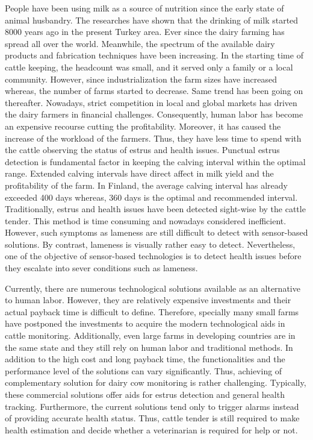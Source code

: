 \documentclass[english,12pt,a4paper,pdftex,elec,utf8]{aaltothesis}
\begin{document}
People have been using milk as a source of nutrition since the early state of animal husbandry. The researches have shown that the drinking of milk started 8000 years ago in the present Turkey area. Ever since the dairy farming has spread all over the world. Meanwhile, the spectrum of the available dairy products and fabrication techniques have been increasing. In the starting time of cattle keeping, the headcount was small, and it served only a family or a local community. However, since industrialization the farm sizes have increased whereas, the number of farms started to decrease. Same trend has been going on thereafter. Nowadays, strict competition in local and global markets has driven the dairy farmers in financial challenges. Consequently, human labor has become an expensive recourse cutting the profitability. Moreover, it has caused the increase of the workload of the farmers. Thus, they have less time to spend with the cattle observing the status of estrus and health issues. Punctual estrus detection is fundamental factor in keeping the calving interval within the optimal range. Extended calving intervals have direct affect in milk yield and the profitability of the farm. In Finland, the average calving interval has already exceeded 400 days whereas, 360 days is the optimal and recommended interval. Traditionally, estrus and health issues have been detected sight-wise by the cattle tender. This method is time consuming and nowadays considered inefficient. However, such symptoms as lameness are still difficult to detect with sensor-based solutions. By contrast, lameness is visually rather easy to detect. Nevertheless, one of the objective of sensor-based technologies is to detect health issues before they escalate into sever conditions such as lameness.

Currently, there are numerous technological solutions available as an alternative to human labor. However, they are relatively expensive investments and their actual payback time is difficult to define. Therefore, specially many small farms have postponed the investments to acquire the modern technological aids in cattle monitoring. Additionally, even large farms in developing countries are in the same state and they still rely on human labor and traditional methods. In addition to the high cost and long payback time, the functionalities and the performance level of the solutions can vary significantly. Thus, achieving of complementary solution for dairy cow monitoring is rather challenging. Typically, these commercial solutions offer aids for estrus detection and general health tracking. Furthermore, the current solutions tend only to trigger alarms instead of providing accurate health status. Thus, cattle tender is still required to make health estimation and decide whether a veterinarian is required for help or not.
\end{document}
